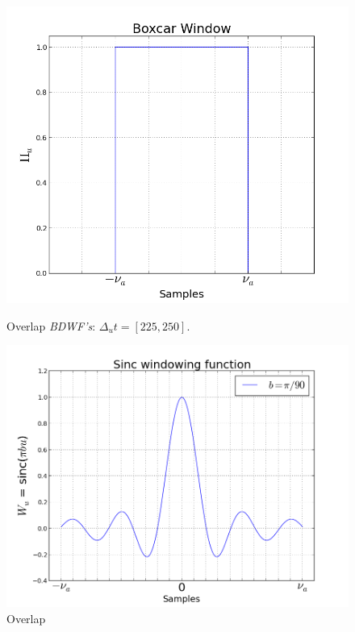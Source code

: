 \documentclass[useAMS,usenatbib]{mn2e}
\begin{document}
\\
\\
\\
\begin{figure}
  \centering
  \begin{minipage}{0.38\linewidth}\includegraphics[width=1\textwidth]{./Figures/rect.png}\caption{Overlap 
		\textit{BDWF's}: $\Delta_u t= [225, 250]$.}\label{ fig:fig_3a}\end{minipage}
\begin{minipage}{0.38\linewidth}\includegraphics[width=1\textwidth]{./Figures/sinc.png}\caption{Overlap 
}
\end{minipage}
\end{figure}
\end{document}
